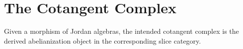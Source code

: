 \section{The Cotangent Complex}

Given a morphism of Jordan algebras, the intended cotangent complex is the
derived abelianization object in the corresponding slice category.
